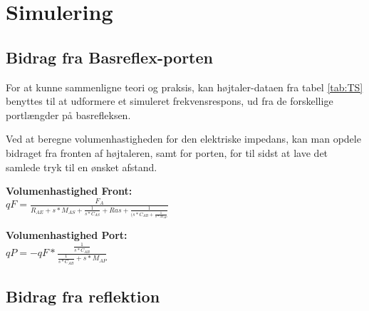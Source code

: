 \chapter{Simulering}

\section{Bidrag fra Basreflex-porten}

For at kunne sammenligne teori og praksis, kan højtaler-dataen fra tabel \ref{tab:TS} benyttes til at udformere et simuleret frekvensrespons, ud fra de forskellige portlængder på basrefleksen. 

Ved at beregne volumenhastigheden for den elektriske impedans, kan man opdele bidraget fra fronten af højtaleren, samt for porten, for til sidst at lave det samlede tryk til en ønsket afstand. 

\textbf{Volumenhastighed Front:}\\

{\Large\(qF=\)}{\huge \(\frac{F_A}{R_{AE}+s*M_{AS}+\frac{1}{s*C_{AS}}+Ras+\frac{1}{(s*C_{AB}+\frac{1}{s*M_{AP}}}}\) }

\textbf{Volumenhastighed Port:}\\

{\Large\(qP=-qF*\)}{\huge \(\frac{\frac{1}{s*C_{AB}}}{\frac{1}{s*C_{AB}}+s*M_{AP}}\) }

\section{Bidrag fra reflektion}

